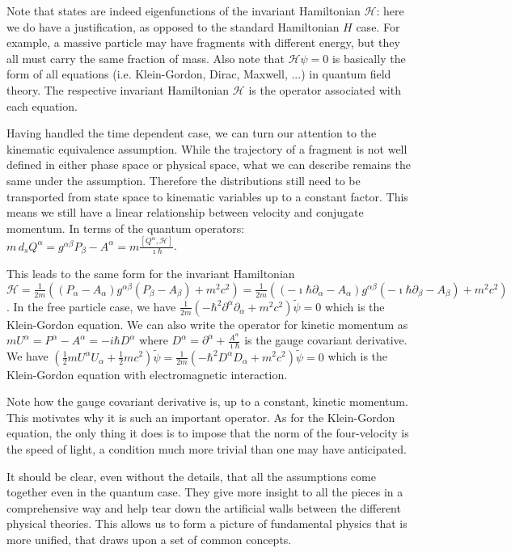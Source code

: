 \documentclass[smallextended]{svjour3}
\numberwithin{equation}{section}
\theoremstyle{definition}
\begin{document}
Note that states are indeed eigenfunctions of the invariant Hamiltonian $\mathcal{H}$: here we do have a justification, as opposed to the standard Hamiltonian $H$ case. For example, a massive particle may have fragments with different energy, but they all must carry the same fraction of mass. Also note that $\mathcal{H} \psi = 0$ is basically the form of all equations (i.e. Klein-Gordon, Dirac, Maxwell, ...) in quantum field theory. The respective invariant Hamiltonian $\mathcal{H}$ is the operator associated with each equation.

Having handled the time dependent case, we can turn our attention to the kinematic equivalence assumption. While the trajectory of a fragment is not well defined in either phase space or physical space, what we can describe remains the same under the assumption. Therefore the distributions still need to be transported from state space to kinematic variables up to a constant factor. This means we still have a linear relationship between velocity and conjugate momentum. In terms of the quantum operators: $m\, d_s Q^\alpha = g^{\alpha\beta} P_{\beta} - A^\alpha = m\frac{[Q^\alpha, \mathcal{H}]}{\imath \hbar}$.

This leads to the same form for the invariant Hamiltonian $\mathcal{H}=\frac{1}{2m}((P_\alpha-A_\alpha)g^{\alpha\beta}(P_\beta-A_\beta) + m^2 c^2) = \frac{1}{2m}((-\imath\hbar\partial_\alpha-A_\alpha)g^{\alpha\beta}(-\imath\hbar\partial_\beta-A_\beta) + m^2 c^2)$. In the free particle case, we have $\frac{1}{2m}(-\hbar^2 \partial^\alpha \partial_\alpha + m^2 c^2) \widetilde{\psi} = 0$ which is the Klein-Gordon equation. We can also write the operator for kinetic momentum as $mU^\alpha = P^\alpha - A^\alpha = -i\hbar D^\alpha$ where $D^\alpha = \partial^\alpha + \frac{A^\alpha}{\imath \hbar}$ is the gauge covariant derivative. We have $(\frac{1}{2}mU^\alpha U_\alpha + \frac{1}{2} m c^2) \widetilde{\psi} = \frac{1}{2m}(-\hbar^2 D^\alpha D_\alpha + m^2 c^2) \widetilde{\psi} = 0$ which is the Klein-Gordon equation with electromagnetic interaction.

Note how the gauge covariant derivative is, up to a constant, kinetic momentum. This motivates why it is such an important operator. As for the Klein-Gordon equation, the only thing it does is to impose that the norm of the four-velocity is the speed of light, a condition much more trivial than one may have anticipated.

It should be clear, even without the details, that all the assumptions come together even in the quantum case. They give more insight to all the pieces in a comprehensive way and help tear down the artificial walls between the different physical theories. This allows us to form a picture of fundamental physics that is more unified, that draws upon a set of common concepts.
\end{document}

